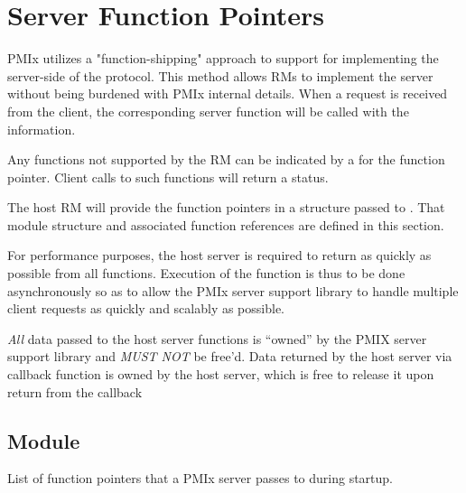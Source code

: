 \section{Server Function Pointers}

\ac{PMIx} utilizes a "function-shipping" approach to support for implementing the server-side of the protocol. This method allows \acp{RM} to implement the server without being burdened with \ac{PMIx} internal details. When a request is received from the client, the corresponding server function will be called with the information.

Any functions not supported by the \ac{RM} can be indicated by a  for the function pointer. Client calls to such functions will return a  status.

The host \ac{RM} will provide the function pointers in a  structure passed to .
That module structure and associated function references are defined in this section.

\advicermstart
For performance purposes, the host server is required to return as quickly as possible from all functions. Execution of
the function is thus to be done asynchronously so as to allow the \ac{PMIx} server support library to handle multiple client requests
as quickly and scalably as possible.

\textit{All} data passed to the host server functions is ``owned'' by the
PMIX server support library and \textit{MUST NOT} be free'd. Data returned
by the host server via callback function is owned by the host
server, which is free to release it upon return from the callback
\advicermend

\subsection{ Module}

\summary

List of function pointers that a PMIx server passes to  during startup.

\format

